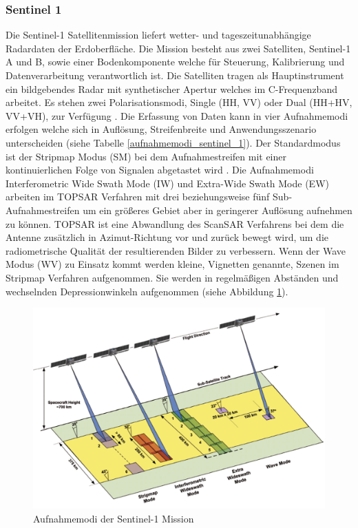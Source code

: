 \subsubsection{Sentinel 1}
Die Sentinel-1 Satellitenmission liefert wetter- und tageszeitunabhängige Radardaten der Erdoberfläche. Die Mission besteht aus zwei Satelliten, Sentinel-1 A und B,
sowie einer Bodenkomponente welche für Steuerung, Kalibrierung und Datenverarbeitung verantwortlich ist. Die Satelliten tragen als Hauptinstrument ein 
bildgebendes Radar mit synthetischer Apertur welches im C-Frequenzband arbeitet. Es stehen zwei Polarisationsmodi, Single (HH, VV) oder Dual (HH+HV, VV+VH),
zur Verfügung \cite{sentinel_1_definition}. 
Die Erfassung von Daten kann in vier Aufnahmemodi erfolgen welche sich in Auflösung, Streifenbreite und Anwendungsszenario unterscheiden (siehe Tabelle \ref{aufnahmemodi_sentinel_1}). 
Der Standardmodus ist der Stripmap Modus (SM) bei dem Aufnahmestreifen mit einer kontinuierlichen Folge von Signalen abgetastet wird \cite{sentinel_1_definition}.
Die Aufnahmemodi Interferometric Wide Swath Mode (IW) und Extra-Wide Swath Mode (EW) arbeiten im TOPSAR Verfahren mit drei beziehungsweise
fünf Sub-Aufnahmestreifen um ein größeres Gebiet aber in geringerer Auflösung aufnehmen zu können. TOPSAR ist eine Abwandlung des ScanSAR Verfahrens bei 
dem die Antenne zusätzlich in Azimut-Richtung vor und zurück bewegt wird, um die radiometrische Qualität der resultierenden Bilder zu verbessern. 
Wenn der Wave Modus (WV) zu Einsatz kommt werden kleine, Vignetten genannte, Szenen im Stripmap Verfahren aufgenommen. Sie werden in regelmäßigen Abständen und
wechselnden Depressionwinkeln aufgenommen (siehe Abbildung \ref{sar_modi_sentinel_1})\cite{tutorial_on_sar}\cite{sentinel_1_definition}.   

\begin{figure}[H]
    \centering
    \includegraphics[width=\textwidth]{Bilder/Aquisition_Modes.png}
    \caption{Aufnahmemodi der Sentinel-1 Mission \cite{sentinel_1_overview}}
    \label{sar_modi_sentinel_1}
\end{figure}

